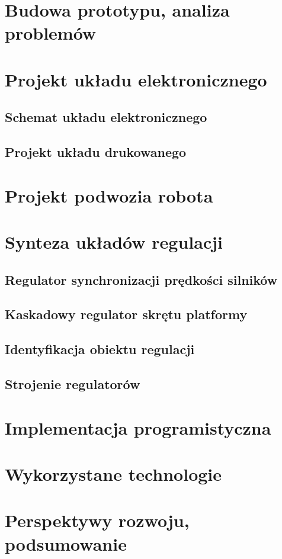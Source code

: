 \documentclass{article}
\begin{document}
\section{Budowa prototypu, analiza problemów}

\section{Projekt układu elektronicznego}
\subsection{Schemat układu elektronicznego}
\subsection{Projekt układu drukowanego}


\section{Projekt podwozia robota}

\section{Synteza układów regulacji}
\subsection{Regulator synchronizacji prędkości silników}
\subsection{Kaskadowy regulator skrętu platformy}
\subsection{Identyfikacja obiektu regulacji}
\subsection{Strojenie regulatorów}

\section{Implementacja programistyczna}

\section{Wykorzystane technologie}

\section{Perspektywy rozwoju, podsumowanie}


\end{document}
